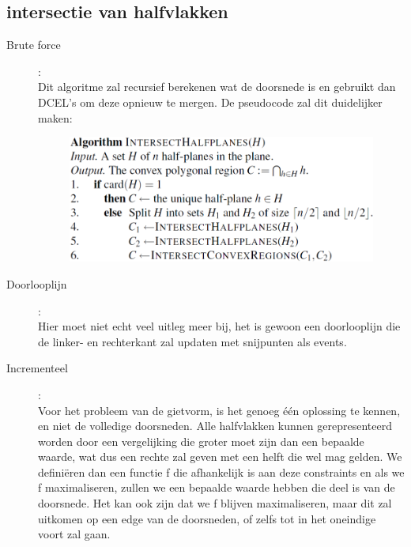 \documentclass[12pt,a4paper]{article}
\begin{document}
	
	\subsection{intersectie van halfvlakken}
	
	\begin{description}
		\item[Brute force]:\\
			Dit algoritme zal recursief berekenen wat de doorsnede is en gebruikt dan DCEL's om deze opnieuw te mergen. De pseudocode zal dit duidelijker maken: 
			\begin{figure}[H]
				\centering
				\includegraphics[width=0.8\linewidth]{afbeeldingen/intersectHalfPlanes}
				\label{fig:intersecthalfplanes}
			\end{figure}
			
		\item[Doorlooplijn]:\\
			Hier moet niet echt veel uitleg meer bij, het is gewoon een doorlooplijn die de linker- en rechterkant zal updaten met snijpunten als events.  
		\item[Incrementeel]:\\
			Voor het probleem van de gietvorm, is het genoeg één oplossing te kennen, en niet de volledige doorsneden. Alle halfvlakken kunnen gerepresenteerd worden door een vergelijking die groter moet zijn dan een bepaalde waarde, wat dus een rechte zal geven met een helft die wel mag gelden. We definiëren dan een functie f die afhankelijk is aan deze constraints en als we f maximaliseren, zullen we een bepaalde waarde hebben die deel is van de doorsnede. Het kan ook zijn dat we f blijven maximaliseren, maar dit zal uitkomen op een edge van de doorsneden, of zelfs tot in het oneindige voort zal gaan. 
			

\end{description}
\end{document}
